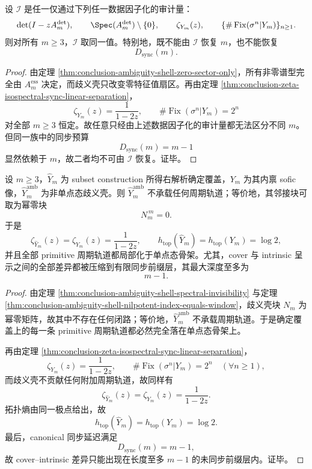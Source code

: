 \begin{corollary}[任何仅依赖非零谱的审计都无法恢复窗口长度]\label{cor:conclusion-nonzero-spectrum-cannot-recover-window-length}
设 \(\mathcal I\) 是任一仅通过下列任一数据因子化的审计量：
\[
\det(I-zA_m^{\det}),
\qquad
\Spec(A_m^{\det})\setminus\{0\},
\qquad
\zeta_{Y_m}(z),
\qquad
\{\#\operatorname{Fix}(\sigma^n|Y_m)\}_{n\ge 1}.
\]
则对所有 \(m\ge 3\)，\(\mathcal I\) 取同一值。特别地，既不能由 \(\mathcal I\) 恢复 \(m\)，也不能恢复
\[
D_{\mathrm{sync}}(m).
\]
\end{corollary}
\begin{proof}
由定理 \ref{thm:conclusion-ambiguity-shell-zero-sector-only}，所有非零谱型完全由 \(A_m^{\mathrm{ess}}\) 决定，而歧义壳只改变零特征值扇区。再由定理 \ref{thm:conclusion-zeta-isospectral-sync-linear-separation}，
\[
\zeta_{Y_m}(z)=\frac1{1-2z},
\qquad
\#\operatorname{Fix}(\sigma^n|Y_m)=2^n
\]
对全部 \(m\ge 3\) 恒定。故任意只经由上述数据因子化的审计量都无法区分不同 \(m\)。但同一族中的同步预算
\[
D_{\mathrm{sync}}(m)=m-1
\]
显然依赖于 \(m\)，故二者均不可由 \(\mathcal I\) 恢复。证毕。
\end{proof}

\begin{theorem}\label{thm:conclusion-ambiguity-shell-preperiodic-localization}
设 \(m\ge 3\)，\(\widehat Y_m\) 为 subset construction 所得右解析确定覆盖，\(Y_m\) 为其内禀 sofic 像，\(\widehat Y_m^{\mathrm{amb}}\) 为非单点态歧义壳。则 \(\widehat Y_m^{\mathrm{amb}}\) 不承载任何周期轨道；等价地，其邻接块可取为幂零块
\[
N_m^{\,m}=0.
\]
于是
\[
\zeta_{\widehat Y_m}(z)=\zeta_{Y_m}(z)=\frac1{1-2z},
\qquad
h_{\mathrm{top}}(\widehat Y_m)=h_{\mathrm{top}}(Y_m)=\log 2,
\]
并且全部 primitive 周期轨道都局部化于单点态骨架。尤其，cover 与 intrinsic 呈示之间的全部差异都被压缩到有限同步前缀层，其最大深度至多为
\[
m-1.
\]
\end{theorem}
\begin{proof}
由定理 \ref{thm:conclusion-ambiguity-shell-spectral-invisibility} 与定理 \ref{thm:conclusion-ambiguity-shell-nilpotent-index-equals-window}，歧义壳块 \(N_m\) 为幂零矩阵，故其中不存在任何闭路；等价地，\(\widehat Y_m^{\mathrm{amb}}\) 不承载周期轨道。于是确定覆盖上的每一条 primitive 周期轨道都必然完全落在单点态骨架上。

再由定理 \ref{thm:conclusion-zeta-isospectral-sync-linear-separation}，
\[
\zeta_{Y_m}(z)=\frac1{1-2z},
\qquad
\#\operatorname{Fix}(\sigma^n|Y_m)=2^n
\quad(\forall n\ge 1),
\]
而歧义壳不贡献任何附加周期轨道，故同样有
\[
\zeta_{\widehat Y_m}(z)=\zeta_{Y_m}(z)=\frac1{1-2z}.
\]
拓扑熵由同一极点给出，故
\[
h_{\mathrm{top}}(\widehat Y_m)=h_{\mathrm{top}}(Y_m)=\log 2.
\]
最后，canonical 同步延迟满足
\[
D_{\mathrm{sync}}(m)=m-1,
\]
故 cover--intrinsic 差异只能出现在长度至多 \(m-1\) 的未同步前缀层内。证毕。
\end{proof}

